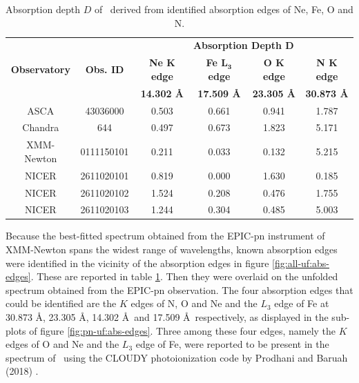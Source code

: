     \begin{table}[!htb]
    	\centering
    	\caption{Absorption depth $D$ of \source\ derived from identified absorption edges of Ne, Fe, O and N.}
    	\label{tab:abs-depth}
		\begin{tabular}{cccccc}
			\hline
			\multirow{3}{*}{\textbf{Observatory}} & \multirow{3}{*}{\textbf{Obs. ID}} & \multicolumn{4}{c}{\textbf{Absorption Depth $\boldsymbol{D}$}} \\ \cline{3-6} & & \textbf{Ne $\boldsymbol{K}$ edge} & \textbf{Fe $\boldsymbol{L_3}$ edge} & \textbf{O $\boldsymbol{K}$ edge} & \textbf{N $\boldsymbol{K}$ edge} \\ \cline{3-6} & & \textbf{14.302 \AA} & \textbf{17.509 \AA} & \textbf{23.305 \AA} & \textbf{30.873 \AA} \\
			\hline
			{ASCA} & {43036000} & {0.503} & {0.661} & {0.941} & {1.787} \\ %
			{Chandra} & {644} & {0.497} & {0.673} & {1.823} & {5.171} \\ %
			{XMM-Newton} & {0111150101} & {0.211} & {0.033} & {0.132} & {5.215} \\ %
			{NICER} & {2611020101} & {0.819} & {0.000} & {1.630} & {0.185} \\ %
			{NICER} & {2611020102} & {1.524} & {0.208} & {0.476} & {1.755} \\
			{NICER} & {2611020103} & {1.244} & {0.304} & {0.485} & {5.003} \\
			\hline
		\end{tabular}
	\end{table}

    Because the best-fitted spectrum obtained from the EPIC-pn instrument of XMM-Newton spans the widest range of wavelengths, known absorption edges \cite{bearden1967reevaluation,juett2006high} were identified in the vicinity of the absorption edges in figure \ref{fig:all-uf:abs-edges}. These are reported in table \ref{tab:abs-depth}. Then they were overlaid on the unfolded spectrum obtained from the EPIC-pn observation. The four absorption edges that could be identified are the $K$ edges of N, O and Ne and the $L_3$ edge of Fe at 30.873 \AA, 23.305 \AA, 14.302 \AA\ and 17.509 \AA\ respectively, as displayed in the sub-plots of figure \ref{fig:pn-uf:abs-edges}. Three among these four edges, namely the $K$ edges of O and Ne and the $L_3$ edge of Fe, were reported to be present in the spectrum of \source\ using the CLOUDY photoionization code by Prodhani and Baruah (2018) \cite{prodhani2018galactic}.

